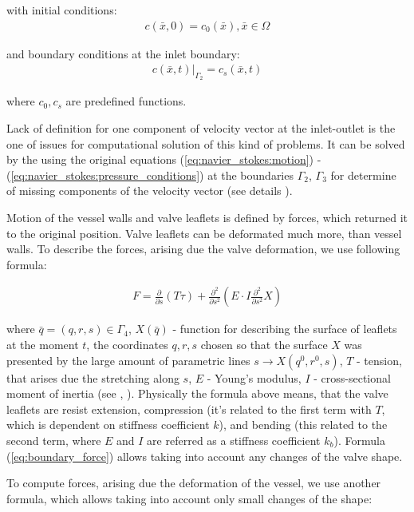 \documentclass[runningheads,a4paper]{llncs}
\begin{document}
with initial conditions:
\begin{gather}
    \label{eq:convection:conditions}
    c(\bar{x}, 0) = c_0(\bar{x}), \bar{x} \in \Omega
\end{gather}

and boundary conditions at the inlet boundary:
\begin{gather}
    \label{eq:convection:conditions}
    c(\bar{x}, t)|_{\Gamma_2} = c_s(\bar{x}, t)
\end{gather}

where $c_0, c_s$ are predefined functions.

Lack of definition for one component of velocity vector at the inlet-outlet is the one of issues for computational solution of this kind of problems.
It can be solved by the using the original equations (\ref{eq:navier_stokes:motion}) - (\ref{eq:navier_stokes:pressure_conditions}) at the boundaries
$\Gamma_2$, $\Gamma_3$ for determine of missing components of the velocity vector (see details \cite{gummel}).

Motion of the vessel walls and valve leaflets is defined by forces, which returned it to the original position. Valve leaflets can be deformated much more,
than vessel walls. To describe the forces, arising due the valve deformation, we use following formula:

\begin{gather}
    \label{eq:boundary_force}
    F = \frac{\partial}{\partial s} (T \tau) + \frac{\partial^2}{\partial s^2} (E \cdot I \frac{\partial^2}{\partial s^2} X)
\end{gather}

where $\bar{q} = (q, r, s) \in \Gamma_4$, $X(\bar{q})$ - function for describing the surface of leaflets at the moment $t$, the coordinates $q, r, s$ chosen so
that the surface $X$ was presented by the large amount of parametric lines $s \rightarrow X(q^0, r^0, s)$, $T$ - tension, that arises due the stretching along $s$,
$E$ - Young's modulus, $I$ - cross-sectional moment of inertia (see \cite{boyce_2011}, \cite{pescin_2002}). Physically the formula above means,
that the valve leaflets are resist extension, compression (it's related to the first term with $T$, which is dependent on stiffness coefficient $k$),
and bending (this related to the second term, where $E$ and $I$ are referred as a stiffness coefficient $k_b$). Formula (\ref{eq:boundary_force}) allows taking
into account any changes of the valve shape.

To compute forces, arising due the deformation of the vessel, we use another formula, which allows taking into account only small changes of the shape:
\end{document}
